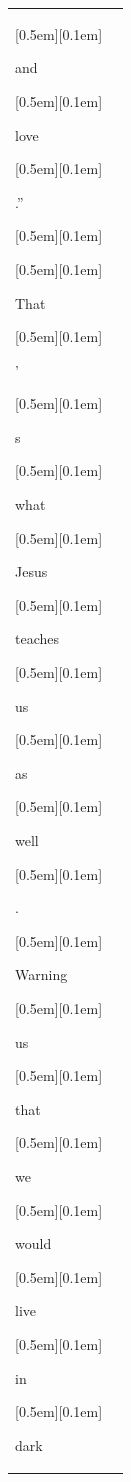 \begin{table}[ht]
\begin{tabular}{@{}l p{13cm}@{}}
{\setlength{\fboxsep}{1pt}\raisebox{0pt}[0.5em][0.1em]{\colorbox{SkyBlue!55}{\strut{ and}}}}{\setlength{\fboxsep}{1pt}\raisebox{0pt}[0.5em][0.1em]{\colorbox{Salmon!60}{\strut{ love}}}}{\setlength{\fboxsep}{1pt}\raisebox{0pt}[0.5em][0.1em]{\colorbox{DarkOrchid!25}{\strut{.”}}}}{\setlength{\fboxsep}{1pt}\raisebox{0pt}[0.5em][0.1em]{\colorbox{DarkOrchid!25}{\strut{ }}}}{\setlength{\fboxsep}{1pt}\raisebox{0pt}[0.5em][0.1em]{\colorbox{SkyBlue!55}{\strut{That}}}}{\setlength{\fboxsep}{1pt}\raisebox{0pt}[0.5em][0.1em]{\colorbox{DarkOrchid!25}{\strut{’}}}}{\setlength{\fboxsep}{1pt}\raisebox{0pt}[0.5em][0.1em]{\colorbox{SkyBlue!55}{\strut{s}}}}{\setlength{\fboxsep}{1pt}\raisebox{0pt}[0.5em][0.1em]{\colorbox{SkyBlue!55}{\strut{ what}}}}{\setlength{\fboxsep}{1pt}\raisebox{0pt}[0.5em][0.1em]{\colorbox{Salmon!60}{\strut{ Jesus}}}}{\setlength{\fboxsep}{1pt}\raisebox{0pt}[0.5em][0.1em]{\colorbox{SkyBlue!55}{\strut{ teaches}}}}{\setlength{\fboxsep}{1pt}\raisebox{0pt}[0.5em][0.1em]{\colorbox{DarkOrchid!25}{\strut{ us}}}}{\setlength{\fboxsep}{1pt}\raisebox{0pt}[0.5em][0.1em]{\colorbox{SkyBlue!55}{\strut{ as}}}}{\setlength{\fboxsep}{1pt}\raisebox{0pt}[0.5em][0.1em]{\colorbox{DarkOrchid!25}{\strut{ well}}}}{\setlength{\fboxsep}{1pt}\raisebox{0pt}[0.5em][0.1em]{\colorbox{DarkOrchid!25}{\strut{.}}}}{\setlength{\fboxsep}{1pt}\raisebox{0pt}[0.5em][0.1em]{\colorbox{Salmon!60}{\strut{ Warning}}}}{\setlength{\fboxsep}{1pt}\raisebox{0pt}[0.5em][0.1em]{\colorbox{DarkOrchid!25}{\strut{ us}}}}{\setlength{\fboxsep}{1pt}\raisebox{0pt}[0.5em][0.1em]{\colorbox{SkyBlue!55}{\strut{ that}}}}{\setlength{\fboxsep}{1pt}\raisebox{0pt}[0.5em][0.1em]{\colorbox{DarkOrchid!25}{\strut{ we}}}}{\setlength{\fboxsep}{1pt}\raisebox{0pt}[0.5em][0.1em]{\colorbox{Salmon!60}{\strut{ would}}}}{\setlength{\fboxsep}{1pt}\raisebox{0pt}[0.5em][0.1em]{\colorbox{Salmon!60}{\strut{ live}}}}{\setlength{\fboxsep}{1pt}\raisebox{0pt}[0.5em][0.1em]{\colorbox{SkyBlue!55}{\strut{ in}}}}{\setlength{\fboxsep}{1pt}\raisebox{0pt}[0.5em][0.1em]{\colorbox{Salmon!60}{\strut{ dark}}}}


\end{tabular}
\end{table}
